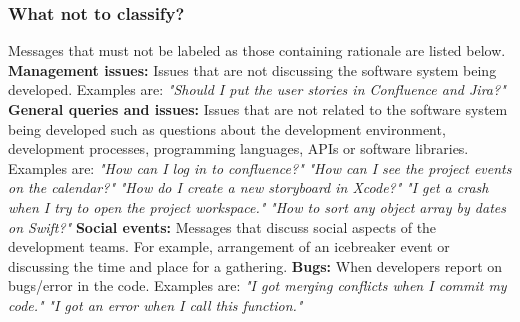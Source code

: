 \documentclass[a4paper,12pt,twoside]{report}
\begin{document}
\subsubsection{What not to classify?}
Messages that must not be labeled as those containing rationale are listed below. 
\newline \newline
\textbf{Management issues:} Issues that are not discussing the software system being developed. Examples are:
\newline \newline 
\textit{"Should I put the user stories in Confluence and Jira?"}
\newline \newline 
\textbf{General queries and issues:} Issues that are not related to the software system being developed such as questions about the development environment, development processes, programming languages, APIs or software libraries. Examples are:
\newline \newline 
\textit{"How can I log in to confluence?"}
\newline \newline 
\textit{"How can I see the project events on the calendar?"}
\newline \newline 
\textit{"How do I create a new storyboard in Xcode?"}
\newline \newline 
\textit{"I get a crash when I try to open the project workspace."}
\newline \newline 
\textit{"How to sort any object array by dates on Swift?"}
\newline \newline 
\textbf{Social events:} Messages that discuss social aspects of the development teams. For example, arrangement of an icebreaker event or discussing the time and place for a gathering.
\newline \newline 
\textbf{Bugs:} When developers report on bugs/error in the code. Examples are: 
\newline \newline 
\textit{"I got merging conflicts when I commit my code."}
\newline \newline 
\textit{"I got an error when I call this function."}
\newline \newline 
\end{document}
